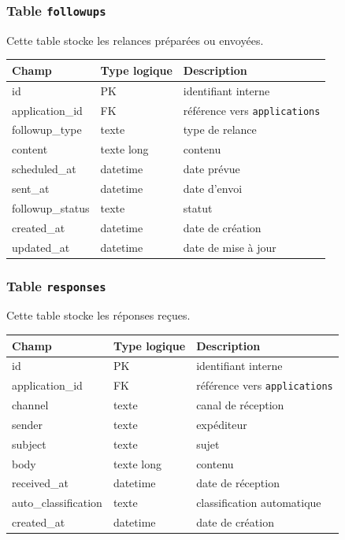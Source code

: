 \documentclass[11pt,a4paper]{article}
\begin{document}
\subsubsection{Table \texttt{followups}}

Cette table stocke les relances préparées ou envoyées.

\begin{center}
\begin{tabular}{|l|l|l|}
\hline
\textbf{Champ} & \textbf{Type logique} & \textbf{Description} \\
\hline
id & PK & identifiant interne \\
application_id & FK & référence vers \texttt{applications} \\
followup_type & texte & type de relance \\
content & texte long & contenu \\
scheduled_at & datetime & date prévue \\
sent_at & datetime & date d’envoi \\
followup_status & texte & statut \\
created_at & datetime & date de création \\
updated_at & datetime & date de mise à jour \\
\hline
\end{tabular}
\end{center}

\subsubsection{Table \texttt{responses}}

Cette table stocke les réponses reçues.

\begin{center}
\begin{tabular}{|l|l|l|}
\hline
\textbf{Champ} & \textbf{Type logique} & \textbf{Description} \\
\hline
id & PK & identifiant interne \\
application_id & FK & référence vers \texttt{applications} \\
channel & texte & canal de réception \\
sender & texte & expéditeur \\
subject & texte & sujet \\
body & texte long & contenu \\
received_at & datetime & date de réception \\
auto_classification & texte & classification automatique \\
created_at & datetime & date de création \\
\hline
\end{tabular}
\end{center}
\end{document}

